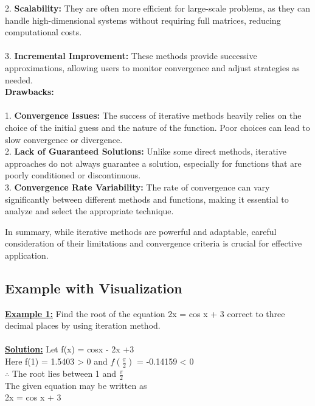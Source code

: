 \documentclass[12pt,a4paper]{article}
\begin{document}
	2. \textbf{Scalability:} They are often more efficient for large-scale problems, as they can handle high-dimensional systems without requiring full matrices, reducing computational costs. \\ \\
	3. \textbf{Incremental Improvement:} These methods provide successive approximations, allowing users to monitor convergence and adjust strategies as needed. \\
	
	
	
	\textbf{Drawbacks:} \\ \\
	1. \textbf{Convergence Issues:} The success of iterative methods heavily relies on the choice of the initial guess and the nature of the function. Poor choices can lead to slow convergence or divergence. \\
	
	2. \textbf{Lack of Guaranteed Solutions:} Unlike some direct methods, iterative approaches do not always guarantee a solution, especially for functions that are poorly conditioned or discontinuous.\\
	
	3. \textbf{Convergence Rate Variability:} The rate of convergence can vary significantly between different methods and functions, making it essential to analyze and select the appropriate technique.
	
	In summary, while iterative methods are powerful and adaptable, careful consideration of their limitations and convergence criteria is crucial for effective application.
	\newpage
	\subsection{Example with Visualization}
	
	
	\textbf{\underline{Example 1:}} Find the root of the equation 2x = cos x + 3 correct to three decimal places by using iteration method. \\ \\
	\textbf{\underline{Solution:}} Let f(x) = cosx - 2x +3 \\
	Here f(1) = 1.5403 > 0 and $f(\frac{\pi}{2})$ = -0.14159 < 0 \\
	$\therefore$ The root lies between 1 and $\frac{\pi}{2}$ \\
	The given equation may be  written as \\ 2x = cos x + 3 \\
	
\end{document}
